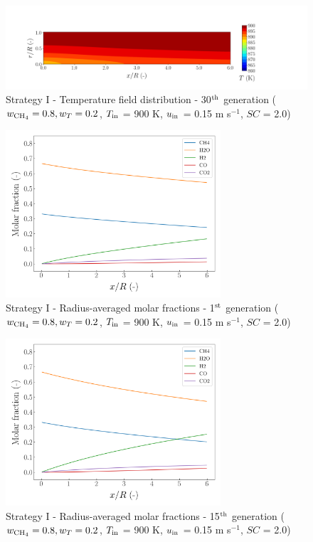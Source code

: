 \documentclass[preprint,12pt]{elsarticle}
\begin{document}
\begin{figure}[h!]
\centering
\includegraphics[width=190mm]{results/5/80C_20T/GEN30-TFIELD.png}
\caption{\label{fig:5R8020G30-TField} Strategy I - Temperature field distribution - 30$^{\rm{th}}$ generation ($w_{\rm{CH_4}} = 0.8, w_T = 0.2$, $T_{\rm{in}}$ = 900 K, $u_{\rm{in}}$ = 0.15 m s$^{-1}$, $SC$ = 2.0)}
\end{figure}


\begin{figure}[h!]
\centering
\includegraphics[width=80mm]{results/5/80C_20T/GEN1-AVG.png}
\caption{\label{fig:5R8020G1-avg} Strategy I - Radius-averaged molar fractions - 1$^{\rm{st}}$ generation ($w_{\rm{CH_4}} = 0.8, w_T = 0.2$, $T_{\rm{in}}$ = 900 K, $u_{\rm{in}}$ = 0.15 m s$^{-1}$, $SC$ = 2.0)}
\end{figure}

\begin{figure}[h!]
\centering
\includegraphics[width=80mm]{results/5/80C_20T/GEN15-AVG.png}
\caption{\label{fig:5R8020G15-avg} Strategy I - Radius-averaged molar fractions - 15$^{\rm{th}}$ generation ($w_{\rm{CH_4}} = 0.8, w_T = 0.2$, $T_{\rm{in}}$ = 900 K, $u_{\rm{in}}$ = 0.15 m s$^{-1}$, $SC$ = 2.0)}
\end{figure}
\end{document}
